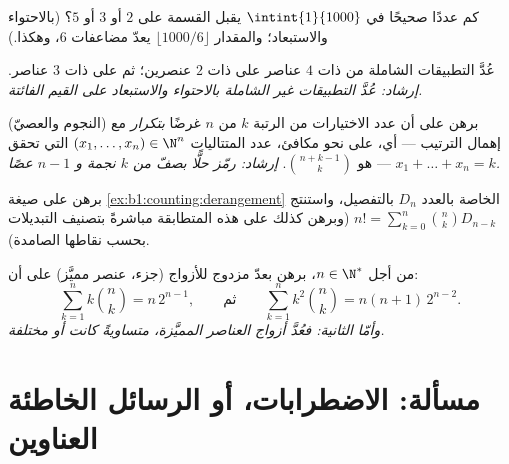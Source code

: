 \begin{exercise}[$\star\star$]\label{exo:b1:counting:8}
كم عددًا صحيحًا في $\intint{1}{1000}$ يقبل القسمة على
$2$ أو $3$ أو $5$؟ (بالاحتواء والاستبعاد؛ والمقدار $\lfloor 1000/6 \rfloor$
يعدّ مضاعفات $6$، وهكذا.)
\end{exercise}

\begin{exercise}[$\star\star$]\label{exo:b1:counting:9}
عُدَّ التطبيقات الشاملة من  ذات $4$ عناصر على  ذات
$2$ عنصرين؛ ثم على  ذات $3$ عناصر. \emph{إرشاد: عُدَّ
التطبيقات غير الشاملة بالاحتواء والاستبعاد على القيم الفائتة.}
\end{exercise}

\begin{exercise}[$\star\star$]\label{exo:b1:counting:10}
(النجوم والعصيّ) برهن على أن عدد الاختيارات من الرتبة $k$ من
$n$ غرضًا \emph{بتكرار} مع إهمال الترتيب --- أي، على نحو مكافئ،
عدد المتتاليات $(x_1, \dots, x_n) \in \N^n$ التي تحقق $x_1 + \dots + x_n = k$
--- هو $\binom{n + k - 1}{k}$. \emph{إرشاد: رمّز حلًّا بصفّ من
$k$ نجمة و $n - 1$ عصًا.}
\end{exercise}

\begin{exercise}[$\star\star\star$]\label{exo:b1:counting:11}
برهن على صيغة \cref{ex:b1:counting:derangement} الخاصة بالعدد $D_n$
بالتفصيل، واستنتج $n! = \sum_{k=0}^{n} \binom{n}{k} D_{n-k}$ (وبرهن
كذلك على هذه المتطابقة مباشرةً بتصنيف التبديلات بحسب 
نقاطها الصامدة).
\end{exercise}

\begin{exercise}[$\star\star\star$]\label{exo:b1:counting:12}
من أجل $n \in \N^*$، برهن بعدّ مزدوج للأزواج (جزء، عنصر مميَّز)
على أن:
\[
\sum_{k=1}^{n} k \binom{n}{k} = n\, 2^{n-1},
\qquad\text{ثم}\qquad
\sum_{k=1}^{n} k^2 \binom{n}{k} = n(n+1)\, 2^{n-2} .
\]
\emph{وأمّا الثانية: فعُدَّ أزواج العناصر المميَّزة، متساويةً
كانت أو مختلفة.}
\end{exercise}

\section{مسألة: الاضطرابات، أو الرسائل الخاطئة العناوين}

